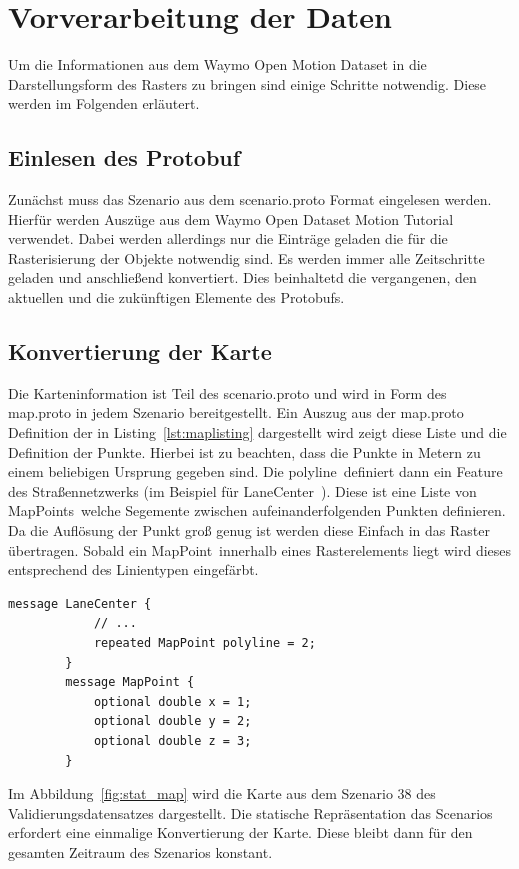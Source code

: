 \documentclass[12pt]{article}
\begin{document}
\section{Vorverarbeitung der Daten}
\label{sec:preprocessing}
    Um die Informationen aus dem Waymo Open Motion Dataset in die Darstellungsform des Rasters zu bringen 
    sind einige Schritte notwendig. Diese werden im Folgenden erläutert. 
    \subsection{Einlesen des Protobuf} 
        Zunächst muss das Szenario aus dem scenario.proto Format eingelesen werden. 
        Hierfür werden Auszüge aus dem Waymo Open Dataset Motion Tutorial~\cite{Tutorial2021} verwendet. 
        Dabei werden allerdings nur die Einträge geladen die für die Rasterisierung der Objekte notwendig sind. 
        Es werden immer alle Zeitschritte geladen und anschließend konvertiert. 
        Dies beinhaltetd die vergangenen, den aktuellen und die zukünftigen Elemente des Protobufs.

    \subsection{Konvertierung der Karte}
        Die Karteninformation ist Teil des scenario.proto und wird in Form des map.proto in jedem Szenario bereitgestellt.
        Ein Auszug aus der map.proto Definition der in Listing~\ref{lst:maplisting} dargestellt wird zeigt diese Liste und die Definition der Punkte. 
        Hierbei ist zu beachten, dass die Punkte in Metern zu einem beliebigen Ursprung gegeben sind. 
        Die \grqq polyline\grqq~definiert dann ein Feature des Straßennetzwerks (im Beispiel für \grqq LaneCenter\grqq~). Diese ist eine Liste von \grqq MapPoints\grqq~welche Segemente zwischen aufeinanderfolgenden Punkten definieren.
        Da die Auflösung der Punkt groß genug ist werden diese Einfach in das Raster übertragen. 
        Sobald ein \grqq MapPoint\grqq~innerhalb eines Rasterelements liegt wird dieses entsprechend des Linientypen eingefärbt.
        \vspace{0.5cm}
        \begin{lstlisting}[language=protobuf2, caption=Auszug aus map.proto, label={lst:maplisting}]
        message LaneCenter {
            // ...
            repeated MapPoint polyline = 2;
        }
        message MapPoint {
            optional double x = 1;
            optional double y = 2;
            optional double z = 3;
        }
        \end{lstlisting}
        Im Abbildung~\ref{fig:stat_map} wird die Karte aus dem Szenario 38 des Validierungsdatensatzes dargestellt. 
        Die statische Repräsentation das Scenarios erfordert eine einmalige Konvertierung der Karte. 
        Diese bleibt dann für den gesamten Zeitraum des Szenarios konstant.
\end{document}
